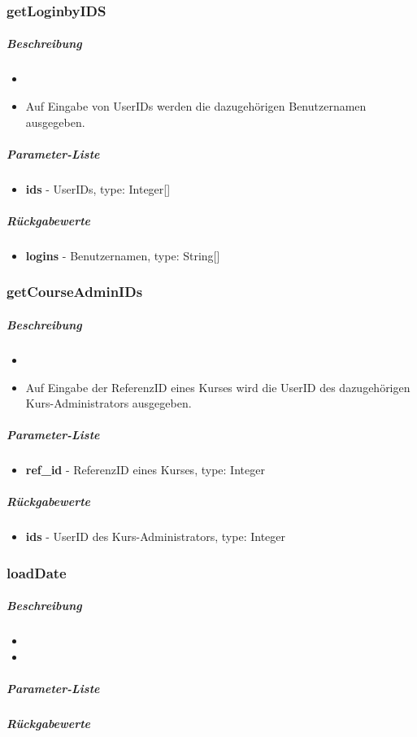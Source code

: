 \subsubsection*{getLoginbyIDS}\label{getLoginbyIDSGDGUI}
\subparagraph{Beschreibung}
\begin{itemize}
	\item[]  \noindent{} 
	\item[] Auf Eingabe von UserIDs werden die dazugehörigen Benutzernamen ausgegeben.
\end{itemize}
\subparagraph{Parameter-Liste}
\begin{itemize}
	\item[] \textbf{ids} - UserIDs, type: Integer[]
\end{itemize}
\subparagraph{Rückgabewerte}
\begin{itemize}
	\item[] \textbf{logins} - Benutzernamen, type: String[]
\end{itemize}

\subsubsection*{getCourseAdminIDs}\label{getCourseAdminIDsGDGUI}
\subparagraph{Beschreibung}
\begin{itemize}
	\item[]  \noindent{} 
	\item[] Auf Eingabe der ReferenzID eines Kurses wird die UserID des dazugehörigen Kurs-Administrators ausgegeben.
\end{itemize}
\subparagraph{Parameter-Liste}
\begin{itemize}
	\item[] \textbf{ref\_id} - ReferenzID eines Kurses, type: Integer
\end{itemize}
\subparagraph{Rückgabewerte}
\begin{itemize}
	\item[] \textbf{ids} - UserID des Kurs-Administrators, type: Integer
\end{itemize}

\subsubsection*{loadDate}\label{loadDateGDGUI}
\subparagraph{Beschreibung}
\begin{itemize}
	\item[] \noindent{}
	\item[] 
\end{itemize}
\subparagraph{Parameter-Liste}
\subparagraph{Rückgabewerte}

